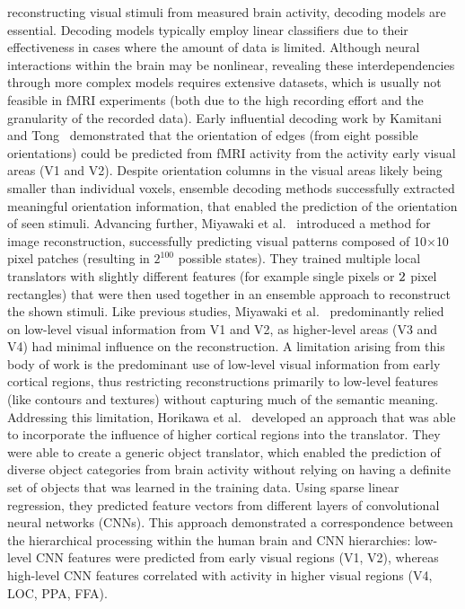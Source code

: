 reconstructing visual stimuli from measured brain activity, decoding models are essential. Decoding models typically employ linear classifiers due to their effectiveness in cases where the amount of data is limited. Although neural interactions within the brain may be nonlinear, revealing these interdependencies through more complex models requires extensive datasets, which is usually not feasible in fMRI experiments (both due to the high recording effort and the granularity of the recorded data). Early influential decoding work by Kamitani and Tong~\cite{kamitaniDecodingVisualSubjective2005} demonstrated that the orientation of edges (from eight possible orientations) could be predicted from fMRI activity from the activity early visual areas (V1 and V2). 
Despite orientation columns in the visual areas likely being smaller than individual voxels, ensemble decoding methods successfully extracted meaningful orientation information, that enabled the prediction of the orientation of seen stimuli. Advancing further, Miyawaki et al.~\cite{miyawakiVisualImageReconstruction2008} introduced a method for image reconstruction, successfully predicting visual patterns composed of 10$\times$10 pixel patches (resulting in $2^{100}$ possible states). They trained multiple local translators with slightly different features (for example single pixels or $2\time1$ pixel rectangles) that were then used together in an ensemble approach to reconstruct the shown stimuli. Like previous studies, Miyawaki et al.~ predominantly relied on low-level visual information from V1 and V2, as higher-level areas (V3 and V4) had minimal influence on the reconstruction. 
A limitation arising from this body of work is the predominant use of low-level visual information from early cortical regions, thus restricting reconstructions primarily to low-level features (like contours and textures) without capturing much of the semantic meaning. Addressing this limitation, Horikawa et al.~\cite{horikawaGenericDecodingSeen2017} developed an approach that was able to incorporate the influence of higher cortical regions into the translator. They were able to create a generic object translator, which enabled the prediction of diverse object categories from brain activity without relying on having a definite set of objects that was learned in the training data. Using sparse linear regression, they predicted feature vectors from different layers of convolutional neural networks (CNNs). This approach demonstrated a correspondence between the hierarchical processing within the human brain and CNN hierarchies: low-level CNN features were predicted from early visual regions (V1, V2), whereas high-level CNN features correlated with activity in higher visual regions (V4, LOC, PPA, FFA).

